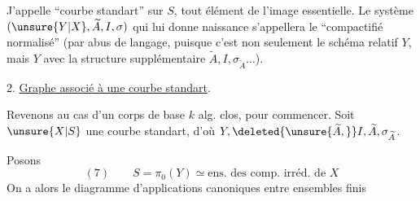 J'appelle ``courbe  standart'' sur $S$, tout élément de l'image essentielle. Le système $(\unsure{Y|X},\widetilde A,I,\sigma)$ qui lui donne naissance s'appellera le ``compactifié normalisé''  (par abus de  langage, puisque c'est non seulement le schéma relatif $Y$, mais $Y$ avec la structure supplémentaire $\widetilde A,I,\sigma_{\widetilde A}\ldots$).

2. \uline{Graphe associé à une courbe standart}.

Revenons au cas d'un corps de base $k$ alg. clos, pour commencer. Soit $\unsure{X|S}$ une courbe standart, d'où $Y,\deleted{\unsure{\widetilde A,}}I,\widetilde A,\sigma_{\widetilde A}$.

Posons
\[
(7)\qquad S=\pi_0(Y)\simeq\text{ens. des comp. irréd. de }X
\]
On a alors le diagramme d'applications canoniques entre ensembles finis
